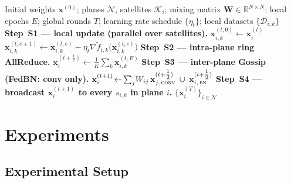 \documentclass[conference]{IEEEtran}
\newcommand{\R}{\mathbb{R}}
\newcommand{\D}{\mathcal{D}}
\newcommand{\OrbitVLIF}{\textsc{OrbitVLIF}}
\begin{document}
\begin{algorithm}[t]
\caption{\OrbitVLIF{} Decentralised Training}\label{alg:orbitvlif}
\begin{algorithmic}[1]
  \REQUIRE Initial weights $\mathbf{x}^{(0)}$; planes $\mathcal{N}$, satellites
           $\mathcal{K}_i$; mixing matrix $\mathbf{W}\!\in\!\R^{N\!\times\!N}$;
           local epochs $E$; global rounds $T$; learning rate
           schedule $\{\eta_t\}$; local datasets $\{\D_{i,k}\}$
    \STATE \textbf{Step~S1 — local update (parallel over satellites).}
      \STATE $\mathbf{x}_{i,k}^{(t,0)} \!\leftarrow\! \mathbf{x}^{(t)}_i$
        \STATE $\mathbf{x}_{i,k}^{(t,e+1)} \!\leftarrow\!
                \mathbf{x}_{i,k}^{(t,e)}\!-\!\eta_t\nabla\widetilde f_{i,k}\!\big(\mathbf{x}_{i,k}^{(t,e)}\big)$
      \ENDFOR
    \ENDFOR
    \STATE \textbf{Step~S2 — intra-plane ring AllReduce.}
      \STATE $\mathbf{x}_i^{(t+\tfrac12)}\!\leftarrow\!\frac{1}{K}\sum_{k}\!\mathbf{x}_{i,k}^{(t,E)}$
    \ENDFOR
    \STATE \textbf{Step~S3 — inter-plane Gossip (FedBN: conv only).}
      \STATE $\mathbf{x}_i^{(t+1)}\!\leftarrow\!
              \sum_{j}\!W_{ij}\,\mathbf{x}_{j,\,\textsc{conv}}^{(t+\tfrac12)}\;\cup\;
              \mathbf{x}_{i,\,\textsc{bn}}^{(t+\tfrac12)}$ 
    \ENDFOR
    \STATE \textbf{Step~S4 — broadcast $\mathbf{x}_i^{(t+1)}$ to every $s_{i,k}$ in plane $i$.}
  \ENDFOR
  \RETURN $\{\mathbf{x}_i^{(T)}\}_{i\in\mathcal{N}}$
\end{algorithmic}
\end{algorithm}


\section{Experiments}\label{sec:experiments}

\subsection{Experimental Setup}\label{sec:exp-setup}
\end{document}
